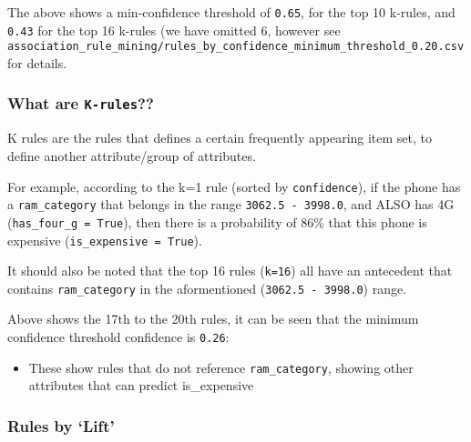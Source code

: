 \documentclass[11pt]{article}
\providecommand{\tightlist}{%
      \setlength{\itemsep}{0pt}\setlength{\parskip}{0pt}}
\begin{document}
    The above shows a min-confidence threshold of \texttt{0.65}, for the top
10 k-rules, and \texttt{0.43} for the top 16 k-rules (we have omitted 6,
however see
\texttt{association\_rule\_mining/rules\_by\_confidence\_minimum\_threshold\_0.20.csv}
for details.

\hypertarget{what-are-k-rules}{%
\subsubsection{\texorpdfstring{What are
\texttt{K-rules}??}{What are K-rules??}}\label{what-are-k-rules}}

K rules are the rules that defines a certain frequently appearing item
set, to define another attribute/group of attributes.

For example, according to the k=1 rule (sorted by \texttt{confidence}),
if the phone has a \texttt{ram\_category} that belongs in the range
\texttt{3062.5\ -\ 3998.0}, and ALSO has 4G
(\texttt{has\_four\_g\ =\ True}), then there is a probability of 86\%
that this phone is expensive (\texttt{is\_expensive\ =\ True}).

It should also be noted that the top 16 rules (\texttt{k=16}) all have
an antecedent that contains \texttt{ram\_category} in the aformentioned
(\texttt{3062.5\ -\ 3998.0}) range.

    Above shows the 17th to the 20th rules, it can be seen that the minimum
confidence threshold confidence is \texttt{0.26}:

\begin{itemize}
\tightlist
\item
  These show rules that do not reference \texttt{ram\_category}, showing
  other attributes that can predict is\_expensive
\end{itemize}

    \hypertarget{rules-by-lift}{%
\subsubsection{Rules by `Lift'}\label{rules-by-lift}}
\end{document}
